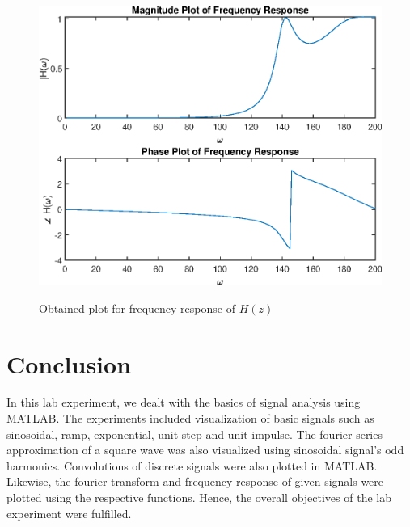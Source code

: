 \documentclass{lab_sheet}
\begin{document}
    \begin{figure}[H]
        \centering
        \includegraphics[scale=0.6]{./Figures/freq_response}
        \label{fig:fourier}
        \caption{Obtained plot for frequency response of $H(z)$}
    \end{figure}

    \section{Conclusion}
    In this lab experiment, we dealt with the basics of signal analysis using MATLAB. The experiments included visualization of basic signals such as sinosoidal, ramp, exponential, unit step and unit impulse. The fourier series approximation of a square wave was also visualized using sinosoidal signal's odd harmonics. Convolutions of discrete signals were also plotted in MATLAB. Likewise, the fourier transform and frequency response of given signals were plotted using the respective functions. Hence, the overall objectives of the lab experiment were fulfilled. 
\end{document}
